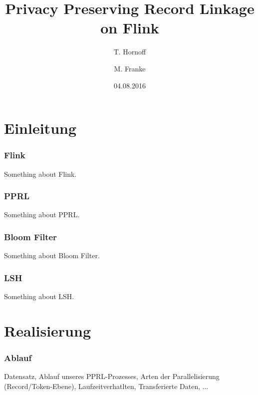 \documentclass{beamer}
\title{Privacy Preserving Record Linkage on Flink}
\author{T. Hornoff \and M. Franke}
\institute{Universität Leipzig - Abteilung Datenbanken}
\date{04.08.2016}
\begin{document}
	\frame{\titlepage}

	\section[Section]{Einleitung}
    \begin{frame}
    		\frametitle{Flink}
        	Something about Flink.
    \end{frame}

	\begin{frame}
    		\frametitle{PPRL}
         Something about PPRL.
    \end{frame}

	\begin{frame}
    		\frametitle{Bloom Filter}
         Something about Bloom Filter.
    \end{frame}
    
    \begin{frame}
    		\frametitle{LSH}
         Something about LSH.
    \end{frame}
    \section[Section]{Realisierung}
    \begin{frame}
    		\frametitle{Ablauf}
    		Datensatz,
         Ablauf unseres PPRL-Prozesses,
         Arten der Parallelisierung (Record/Token-Ebene),
         Laufzeitverhatlten,
         Transferierte Daten,
         ...
    \end{frame}
    
\end{document}
